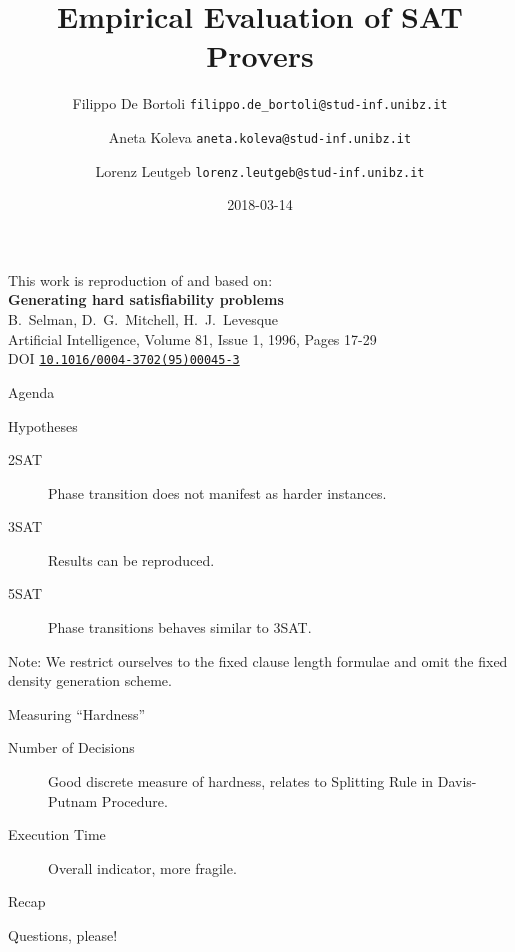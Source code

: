 \documentclass[xcolor={table,usenames,dvipsnames}]{beamer}
\title{Empirical Evaluation of SAT Provers}
\author{Filippo De Bortoli \texorpdfstring{\newline \texttt{\tiny filippo.de\_bortoli@stud-inf.unibz.it} \newline }{<lorenz.leutgeb@stud-inf.unibz.it>}%
\and Aneta Koleva \texorpdfstring{\newline \texttt{\tiny aneta.koleva@stud-inf.unibz.it} \newline}{<aneta.koleva@stud-inf.unibz.it>}%
\and Lorenz Leutgeb \texorpdfstring{\newline \texttt{\tiny lorenz.leutgeb@stud-inf.unibz.it} \newline}{<lorenz.leutgeb@stud-inf.unibz.it>}}
\institute{Free University of Bozen-Bolzano}
\date{2018-03-14}
\begin{document}
\begin{frame}[plain]
\maketitle
\end{frame}

\begin{frame}[plain]
This work is reproduction of and based on:\\[3mm]

{\large\bfseries Generating hard satisfiability problems}\\[1mm]
B.\ Selman, D.\ G.\ Mitchell, H.\ J.\ Levesque\\[2mm]
Artificial Intelligence, Volume 81, Issue 1, 1996, Pages 17-29\\[1mm]
DOI \href{http://dx.doi.org/10.1016/0004-3702(95)00045-3}{\texttt{10.1016/0004-3702(95)00045-3}}\\[3mm]
{\small \color{gray}{(detailed reference in the end)}}
\end{frame}

\begin{frame}{Agenda}
\tableofcontents
\end{frame}

\begin{frame}{Hypotheses}
\begin{description}
	\item[2SAT]{Phase transition does not manifest as harder instances.}
    \item[3SAT]{Results can be reproduced.}
    \item[5SAT]{Phase transitions behaves similar to 3SAT.}
\end{description}

\alert{Note:} We restrict ourselves to the fixed clause length formulae and omit the fixed density generation scheme.
\end{frame}

\begin{frame}{Measuring \enquote{Hardness}}
\begin{description}
    \item[Number of Decisions]{Good discrete measure of hardness, relates to \alert{Splitting Rule}  in Davis-Putnam Procedure.}
	\item[Execution Time]{Overall indicator, more fragile.}
\end{description}
\end{frame}

\begin{frame}{Recap}
\tableofcontents
\end{frame}

\begin{frame}[standout]
Questions, please!
\end{frame}
\end{document}
